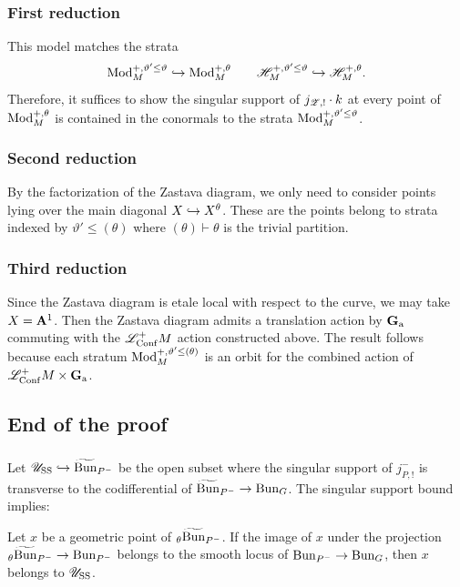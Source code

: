 \subsubsection{First reduction} This model matches the strata
    \[\Mod_M^{+, \vartheta' \le \vartheta} \mon \Mod_M^{+, \theta}
    \qquad
    \HH_M^{+, \vartheta' \le \vartheta} \mon \HH_M^{+,\theta}.\]
Therefore, it suffices to show the singular support of $j_{\ZZ,!} \cdot k$ at every point of $\Mod_M^{+,\theta}$ is contained in the conormals to the strata $\Mod_M^{+, \vartheta' \le \vartheta}$.

\subsubsection{Second reduction} By the factorization of the Zastava diagram, we only need to consider points lying over the main diagonal $X \mon X^\theta$. These are the points belong to strata indexed by $\vartheta' \le (\theta)$ where $(\theta) \vdash \theta$ is the trivial partition.

\subsubsection{Third reduction} Since the Zastava diagram is etale local with respect to the curve, we may take $X = \AA^1$. Then the Zastava diagram admits a translation action by $\Ga$ commuting with the $\LL_\Conf^+ M$ action constructed above. The result follows because each stratum $\Mod_M^{+, \vartheta' \le (\theta)}$ is an orbit for the combined action of $\LL_\Conf^+ M \times \Ga$.

\subsection{End of the proof}

\subsubsection{} Let $\UU_\Sing \mon \Bunt_{P^-}$ be the open subset where the singular support of $j_{P,!}^-$ is transverse to the codifferential of $\Bunt_{P^-} \to \Bun_G$. The singular support bound implies:

\begin{proposition}
Let $x$ be a geometric point of ${}_\theta \Bunt_{P^-}$. If the image of $x$ under the projection ${}_\theta \Bunt_{P^-} \to \Bun_{P^-}$ belongs to the smooth locus of $\Bun_{P^-} \to \Bun_G$, then $x$ belongs to $\UU_\Sing$.
\end{proposition}

